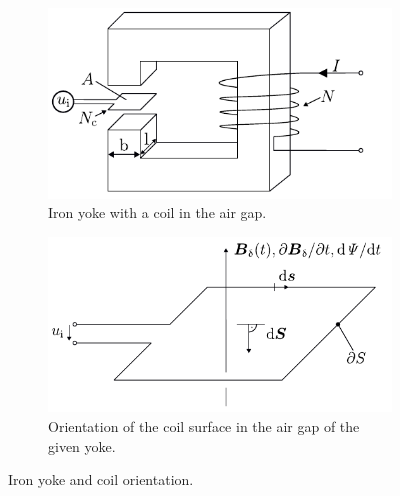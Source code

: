 \begin{figure}[htb]
    \centering
    \begin{subfigure}[b]{0.4\textwidth}
        \centering
        \includegraphics{fig/ex01/MagneticIron3D.pdf}
        \caption{Iron yoke with a coil in the air gap.}
        \label{fig:MagneticIron3D}
    \end{subfigure}
    \quad
    \begin{subfigure}[b]{0.4\textwidth}
        \centering
        \includegraphics{fig/ex01/CoilSurface.pdf}
        \caption{Orientation of the coil surface in the air gap of the given yoke.}
        \label{fig:CoilSurface}
    \end{subfigure}
    \caption{Iron yoke and coil orientation.}
\end{figure}






